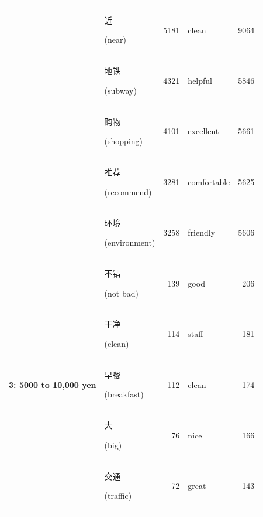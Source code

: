\documentclass[smallextended,natbib]{svjour3}       %
\begin{document}
\begin{table}[ht]
{\begin{tabular}{|c|lr|lr|}
                                                             & \begin{CJK}{UTF8}{gbsn}近\end{CJK} (near)             & 5181  & clean       & 9064  \\  
                                                             & \begin{CJK}{UTF8}{gbsn}地铁\end{CJK} (subway)          & 4321  & helpful     & 5846  \\  
                                                             & \begin{CJK}{UTF8}{gbsn}购物\end{CJK} (shopping)        & 4101  & excellent   & 5661  \\  
                                                             & \begin{CJK}{UTF8}{gbsn}推荐\end{CJK} (recommend)       & 3281  & comfortable & 5625  \\  
                                                             & \begin{CJK}{UTF8}{gbsn}环境\end{CJK} (environment)    & 3258  & friendly    & 5606  \\ \hline
        \multirow{10}{*}{\textbf{3: 5000 to 10,000 yen}}     & \begin{CJK}{UTF8}{gbsn}不错\end{CJK} (not bad)         & 139   & good        & 206   \\  
                                                             & \begin{CJK}{UTF8}{gbsn}干净\end{CJK} (clean)           & 114   & staff       & 181   \\  
                                                             & \begin{CJK}{UTF8}{gbsn}早餐\end{CJK} (breakfast)       & 112   & clean       & 174   \\  
                                                             & \begin{CJK}{UTF8}{gbsn}大\end{CJK} (big)              & 76    & nice        & 166   \\  
                                                             & \begin{CJK}{UTF8}{gbsn}交通\end{CJK} (traffic)         & 72    & great       & 143   \\  

\end{tabular}}
\end{table}
\end{document}
